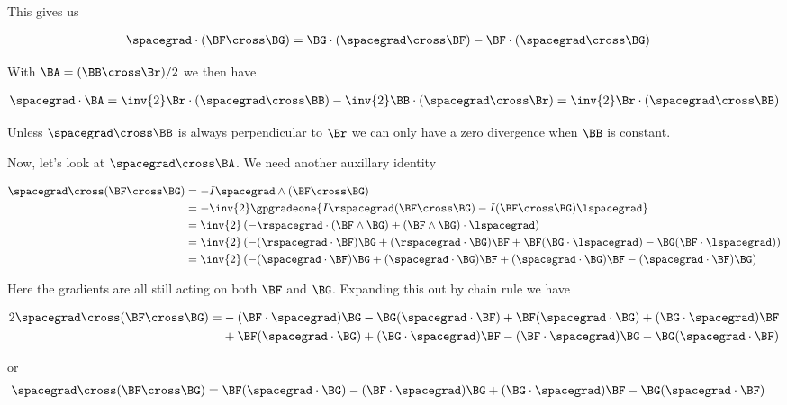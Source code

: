 This gives us

\begin{align}\label{eqn:desaiCh6:2}
\spacegrad \cdot (\BF \cross \BG)
&=
\BG \cdot (\spacegrad \cross \BF)  - \BF \cdot (\spacegrad \cross \BG)
\end{align}

With $\BA = (\BB \cross \Br)/2$ we then have

\begin{align}\label{eqn:desaiCh6:3}
\spacegrad \cdot \BA =
\inv{2} \Br \cdot (\spacegrad \cross \BB)  - \inv{2} \BB \cdot (\spacegrad \cross \Br)
=
\inv{2} \Br \cdot (\spacegrad \cross \BB)
\end{align}

Unless $\spacegrad \cross \BB$ is always perpendicular to $\Br$ we can only have a zero divergence when $\BB$ is constant.

Now, let's look at $\spacegrad \cross \BA$.  We need another auxillary identity

\begin{align*}
\spacegrad \cross (\BF \cross \BG)
&=
-I \spacegrad \wedge (\BF \cross \BG) \\
&=
-\inv{2} \gpgradeone{
I \rspacegrad (\BF \cross \BG)
- I (\BF \cross \BG) \lspacegrad
} \\
&=
\inv{2} \left(
-\rspacegrad \cdot (\BF \wedge \BG)
+ (\BF \wedge \BG) \cdot \lspacegrad
\right) \\
&=
\inv{2} \left(
-(\rspacegrad \cdot \BF) \BG
+(\rspacegrad \cdot \BG) \BF
+ \BF (\BG \cdot \lspacegrad )
- \BG (\BF \cdot \lspacegrad )
\right)
\\
&=
\inv{2} \left(
-(\spacegrad \cdot \BF) \BG
+(\spacegrad \cdot \BG) \BF
+ (\spacegrad \cdot \BG ) \BF
- (\spacegrad \cdot \BF ) \BG
\right)
\end{align*}

Here the gradients are all still acting on both $\BF$ and $\BG$.  Expanding this out by chain rule we have

\begin{align*}
2 \spacegrad \cross (\BF \cross \BG)
=
&-(\BF \cdot \spacegrad) \BG
-\BG (\spacegrad \cdot \BF)   
+\BF (\spacegrad \cdot \BG)
+(\BG \cdot \spacegrad ) \BF  \\
\quad&+\BF (\spacegrad \cdot \BG )
+ (\BG \cdot \spacegrad ) \BF  
- (\BF \cdot \spacegrad ) \BG
- \BG (\spacegrad \cdot \BF )
\end{align*}

or
\begin{align}\label{eqn:desaiCh6:4}
\spacegrad \cross (\BF \cross \BG)
&=
\BF (\spacegrad \cdot \BG) -(\BF \cdot \spacegrad) \BG
+(\BG \cdot \spacegrad ) \BF  -\BG (\spacegrad \cdot \BF)
\end{align}

